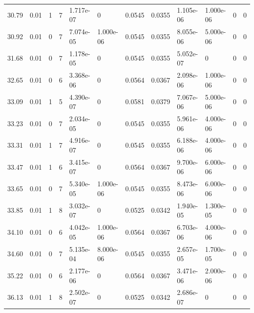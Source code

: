 \documentclass[preview]{standalone}
\begin{document}
{{{\begin{tabular}{L{1.2cm}C{1.2cm} C{0.3cm}C{0.5cm} C{1.4cm}C{1.4cm} C{1.4cm}C{1.4cm} C{1.6cm}C{1.6cm} C{1.6cm}C{1.6cm}}
  30.79  &  0.01  & 1     &  7 &  1.717e-07  & 0  &  0.0545&   0.0355& 1.105e-06 & 1.000e-06   &  0 & 0  \\ 
  30.92  &  0.01  & 0     &  7 &  7.074e-05  & 1.000e-06  &  0.0545&   0.0355& 8.055e-06 & 5.000e-06   &  0 & 0  \\ 
  31.68  &  0.01  & 0     &  7 &  1.178e-05  & 0  &  0.0545&   0.0355& 5.052e-07 & 0   &  0 & 0  \\ 
  32.65  &  0.01  & 0     &  6 &  3.368e-06  & 0  &  0.0564&   0.0367& 2.098e-06 & 1.000e-06   &  0 & 0  \\ 
  33.09  &  0.01  & 1     &  5 &  4.390e-07  & 0  &  0.0581&   0.0379& 7.067e-06 & 5.000e-06   &  0 & 0  \\ 
  33.23  &  0.01  & 0     &  7 &  2.034e-05  & 0  &  0.0545&   0.0355& 5.961e-06 & 4.000e-06   &  0 & 0  \\ 
  33.31  &  0.01  & 1     &  7 &  4.916e-07  & 0  &  0.0545&   0.0355& 6.188e-06 & 4.000e-06   &  0 & 0  \\ 
  33.47  &  0.01  & 1     &  6 &  3.415e-07  & 0  &  0.0564&   0.0367& 9.700e-06 & 6.000e-06   &  0 & 0  \\ 
  33.65  &  0.01  & 0     &  7 &  5.340e-05  & 1.000e-06  &  0.0545&   0.0355& 8.473e-06 & 6.000e-06   &  0 & 0  \\ 
  33.85  &  0.01  & 1     &  8 &  3.032e-07  & 0  &  0.0525&   0.0342& 1.940e-05 & 1.300e-05   &  0 & 0  \\ 
  34.10  &  0.01  & 0     &  6 &  4.042e-05  & 1.000e-06  &  0.0564&   0.0367& 6.703e-06 & 4.000e-06   &  0 & 0  \\ 
  34.60  &  0.01  & 0     &  7 &  5.135e-04  & 8.000e-06  &  0.0545&   0.0355& 2.657e-05 & 1.700e-05   &  0 & 0  \\ 
  35.22  &  0.01  & 0     &  6 &  2.177e-06  & 0  &  0.0564&   0.0367& 3.471e-06 & 2.000e-06   &  0 & 0  \\ 
  36.13  &  0.01  & 1     &  8 &  2.502e-07  & 0  &  0.0525&   0.0342& 2.686e-07 & 0   &  0 & 0  \\ 
\hline 
\end{tabular} 

}}}
\end{document}
